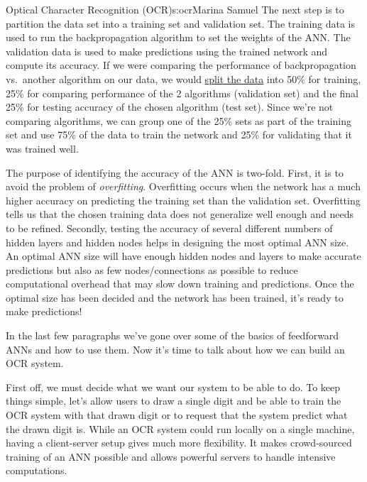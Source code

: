 \begin{aosachapter}{Optical Character Recognition (OCR)}{s:ocr}{Marina Samuel}
The next step is to partition the data set into a training set and
validation set. The training data is used to run the backpropagation
algorithm to set the weights of the ANN. The validation data is used to
make predictions using the trained network and compute its accuracy. If
we were comparing the performance of backpropagation vs.~another
algorithm on our data, we would
\href{http://www-group.slac.stanford.edu/sluo/Lectures/stat_lecture_files/sluo2006lec7.pdf}{split
the data} into 50\% for training, 25\% for comparing performance of the
2 algorithms (validation set) and the final 25\% for testing accuracy of
the chosen algorithm (test set). Since we're not comparing algorithms,
we can group one of the 25\% sets as part of the training set and use
75\% of the data to train the network and 25\% for validating that it
was trained well.

The purpose of identifying the accuracy of the ANN is two-fold. First,
it is to avoid the problem of \emph{overfitting}. Overfitting occurs
when the network has a much higher accuracy on predicting the training
set than the validation set. Overfitting tells us that the chosen
training data does not generalize well enough and needs to be refined.
Secondly, testing the accuracy of several different numbers of hidden
layers and hidden nodes helps in designing the most optimal ANN size. An
optimal ANN size will have enough hidden nodes and layers to make
accurate predictions but also as few nodes/connections as possible to
reduce computational overhead that may slow down training and
predictions. Once the optimal size has been decided and the network has
been trained, it's ready to make predictions!

\label{design-decisions-in-a-simple-ocr-system}

\label{sec.ocr.decisions} In the last few paragraphs we've gone over
some of the basics of feedforward ANNs and how to use them. Now it's
time to talk about how we can build an OCR system.

First off, we must decide what we want our system to be able to do. To
keep things simple, let's allow users to draw a single digit and be able
to train the OCR system with that drawn digit or to request that the
system predict what the drawn digit is. While an OCR system could run
locally on a single machine, having a client-server setup gives much
more flexibility. It makes crowd-sourced training of an ANN possible and
allows powerful servers to handle intensive computations.


\end{aosachapter}
